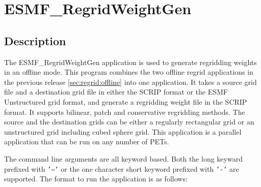 \section{ESMF\_RegridWeightGen}
\label{sec:ESMF_RegridWeightGen}

\subsection{Description}

The ESMF\_RegridWeightGen application is used to generate regridding weights in an offline mode.
This program combines the two offline regrid applications in the previous release 
\ref{sec:regrid:offline} into one application.  It takes a source grid file and a destination grid file
in either the SCRIP format or the ESMF Unstructured grid format, and generate a regridding weight 
file in the SCRIP format.  It supports bilinear, patch and conservative regridding methods.  
The source and the destination grids can be either a regularly rectangular grid or an unstructured grid
including cubed sphere grid.  This application is a parallel application that can be run on any number of PETs.

The command line arguments are all keyword based.  Both the long keyward prefixed with {\tt '--'} or the 
one character short keyword prefixed with {\tt '-'} are supported.  The format to run the application is 
as follows:

